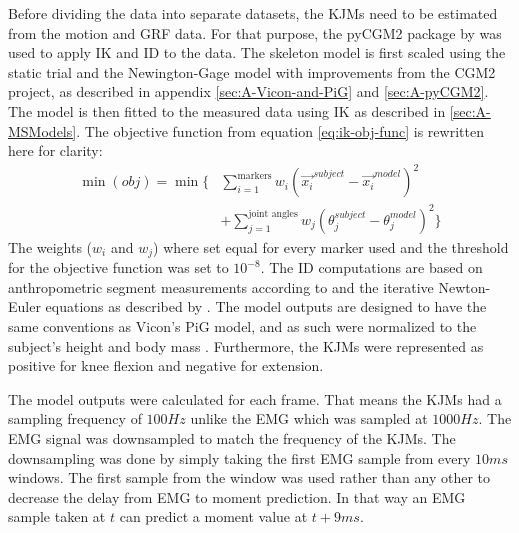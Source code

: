 \documentclass[../main.tex]{subfiles}
\begin{document}
Before dividing the data into separate datasets, the \acp{KJM} need to be estimated from the motion and \ac{GRF} data.
For that purpose, the pyCGM2 package by \textcite{Leboeuf2019} was used to apply \ac{IK} and \ac{ID} to the data.
The skeleton model is first scaled using the static trial and the Newington-Gage model with improvements from the CGM2 project, as described in appendix \ref{sec:A-Vicon-and-PiG} and \ref{sec:A-pyCGM2}.
The model is then fitted to the measured data using \ac{IK} as described in \ref{sec:A-MSModels}. 
The objective function from equation \ref{eq:ik-obj-func} is rewritten here for clarity:
\begin{align*}
    \min(obj) = \min\biggl\{ &\sum_{i=1}^{\text{markers}}w_i \left(\Vec{x_i}^{subject}-\Vec{x_i}^{model}\right)^2 \nonumber\\ 
    &+ \sum_{j=1}^{\text{joint angles}}w_j \left( \theta_j^{subject}-\theta_j^{model}\right)^2 \biggr\}
\end{align*}
The weights ($w_i$ and $w_j$) where set equal for every marker used and the threshold for the objective function was set to $10^{-8}$.
The \ac{ID} computations are based on anthropometric segment measurements according to \textcite{Dempster1955} and the iterative Newton-Euler equations as described by \textcite{Dumas2004}.
The model outputs are designed to have the same conventions as Vicon's \ac{PiG} model, and as such were normalized to the subject's height and body mass \cite{Leboeuf2019, viconpig}.
Furthermore, the \acp{KJM} were represented as positive for knee flexion and negative for extension.

The model outputs were calculated for each frame.
That means the \acp{KJM} had a sampling frequency of $100Hz$ unlike the \ac{EMG} which was sampled at $1000Hz$.
The \ac{EMG} signal was downsampled to match the frequency of the \acp{KJM}. 
The downsampling was done by simply taking the first \ac{EMG} sample from every $10ms$ windows. 
The first sample from the window was used rather than any other to decrease the delay from \ac{EMG} to moment prediction. 
In that way an \ac{EMG} sample taken at $t$ can predict a moment value at $t+9ms$. 

\end{document}
